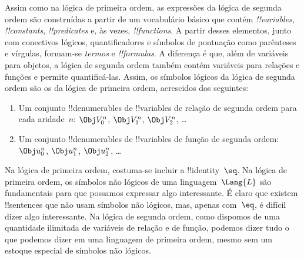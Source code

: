 \documentclass[../../../include/open-logic-section]{subfiles}
\begin{document}


Assim como na lógica de primeira ordem, as expressões da lógica de
segunda ordem são construídas a partir de um vocabulário básico que
contém \emph{!!{variable}s}, \emph{!!{constant}s},
\emph{!!{predicate}s} e, às vezes, \emph{!!{function}s}.  A partir
desses elementos, junto com conectivos lógicos, quantificadores e
símbolos de pontuação como parênteses e vírgulas, formam-se
\emph{termos} e \emph{!!{formula}s}.  A diferença é que, além de
variáveis para objetos, a lógica de segunda ordem também contém
variáveis para relações e funções e permite quantificá-las. Assim, os
símbolos lógicos da lógica de segunda ordem são os da lógica de
primeira ordem, acrescidos dos seguintes:

\begin{enumerate}
\item Um conjunto !!{denumerable}s de !!{variable}s de relação de
  segunda ordem para cada aridade~$n$: $\Obj V_0^n$, $\Obj V_1^n$, $\Obj V_2^n$, \dots
\item Um conjunto !!{denumerable}s de !!{variable}s de função de segunda ordem:
  $\Obj u_0^n$, $\Obj u_1^n$, $\Obj u_2^n$, \dots
\end{enumerate}

Na lógica de primeira ordem, costuma-se incluir a !!{identity}~$\eq$.
Na lógica de primeira ordem, os símbolos não lógicos de uma
linguagem~$\Lang{L}$ são fundamentais para que possamos expressar algo
interessante. É claro que existem !!{sentences} que não usam símbolos
não lógicos, mas, apenas com~$\eq$, é difícil dizer algo interessante.
Na lógica de segunda ordem, como dispomos de uma quantidade ilimitada
de variáveis de relação e de função, podemos dizer tudo o que podemos
dizer em uma linguagem de primeira ordem, mesmo sem um estoque
especial de símbolos não lógicos.
\end{document}
